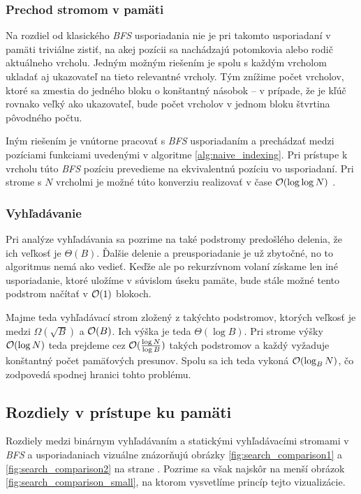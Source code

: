 \subsubsection{Prechod stromom v pamäti}
Na rozdiel od klasického \emph{BFS} usporiadania nie je pri takomto usporiadaní v pamäti triviálne zistiť, na akej pozícii sa nachádzajú potomkovia alebo rodič aktuálneho vrcholu. Jedným možným riešením je spolu s každým vrcholom ukladať aj ukazovateľ na tieto relevantné vrcholy. Tým znížime počet vrcholov, ktoré sa zmestia do jedného bloku o konštantný násobok -- v prípade, že je kľúč rovnako veľký ako ukazovateľ, bude počet vrcholov v jednom bloku štvrtina pôvodného počtu.

Iným riešením je vnútorne pracovať s \emph{BFS} usporiadaním a prechádzať medzi pozíciami funkciami uvedenými v algoritme \ref{alg:naive_indexing}. Pri prístupe k vrcholu túto \emph{BFS} pozíciu prevedieme na ekvivalentnú pozíciu vo  usporiadaní. Pri strome s $N$ vrcholmi je možné túto konverziu realizovať v čase $\mathcal{O}(\log\log N)$ \citep{kasheff2004cache}.

\subsubsection{Vyhľadávanie} \label{sec:static-search}

Pri analýze vyhľadávania sa pozrime na také podstromy predošlého delenia, že ich veľkosť je $\Theta(B)$. Ďalšie delenie a preusporiadanie je už zbytočné, no to \obliv algoritmus nemá ako vedieť. Keďže ale po rekurzívnom volaní získame len iné usporiadanie, ktoré uložíme v súvislom úseku pamäte, bude stále možné tento podstrom načítať v $\mathcal{O}(1)$ blokoch.

Majme teda vyhľadávací strom zložený z takýchto podstromov, ktorých veľkosť je medzi $\Omega(\sqrt{B})$ a $\mathcal{O}(B)$. Ich výška je teda $\Theta(\log{B})$. Pri strome výšky $\mathcal{O}(\log N)$ teda prejdeme cez $\mathcal{O}(\frac{\log{N}}{\log{B}})$ takých podstromov a každý vyžaduje konštantný počet pamäťových presunov. Spolu sa ich teda vykoná $\mathcal{O}(\log_B{N})$, čo zodpovedá spodnej hranici tohto problému.

\subsection{Rozdiely v prístupe ku pamäti} \label{sec:memaccess_patterns}
Rozdiely medzi binárnym vyhľadávaním a statickými vyhľadávacími stromami v \emph{BFS} a \vEB{} usporiadaniach vizuálne znázorňujú obrázky \ref{fig:search_comparison1} a \ref{fig:search_comparison2} na strane \pageref{fig:search_comparison1}. Pozrime sa však najskôr na menší obrázok \ref{fig:search_comparison_small}, na ktorom vysvetlíme princíp tejto vizualizácie.

